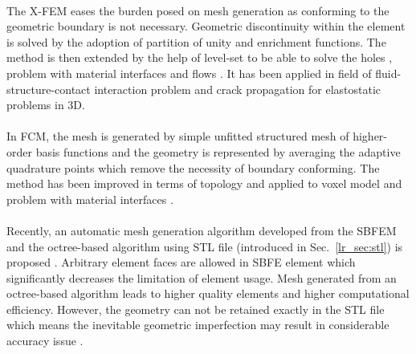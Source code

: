 \paragraph{}
The X-FEM eases the burden posed on mesh generation as conforming to the geometric boundary is not necessary.
Geometric discontinuity within the element is solved by the adoption of partition of unity \citep{MELENK1996289} and enrichment functions.
The method is then extended by the help of level-set \citep{OSHER198812} to be able to solve the holes \citep{Sukumar2001}, problem with material interfaces \citep{doi:10.1002/nme.2259} and flows \citep{Chessa2003}.
It has been applied in field of fluid-structure-contact interaction problem \citep{Mayer2010} and crack propagation for elastostatic problems \citep{doi:10.1002/nme.429,doi:10.1002/nme.430} in 3D.

\paragraph{}
In FCM, the mesh is generated by simple unfitted structured mesh of higher-order basis functions and the geometry is represented by averaging the adaptive quadrature points which remove the necessity of boundary conforming.
The method has been improved in terms of topology \citep{Parvizian2012} and applied to voxel model \citep{doi:10.1002/nme.3289} and problem with material interfaces \citep{Joulaian2013}.

\paragraph{}
Recently, an automatic mesh generation algorithm developed from the SBFEM and the octree-based algorithm using STL file (introduced in Sec.~\ref{lr_sec:stl}) is proposed \citep{Liu2017}.
Arbitrary element faces are allowed in SBFE element which significantly decreases the limitation of element usage.
Mesh generated from an octree-based algorithm leads to higher quality elements and higher computational efficiency.
However, the geometry can not be retained exactly in the STL file which means the inevitable geometric imperfection may result in considerable accuracy issue \citep{Hug2005}.

